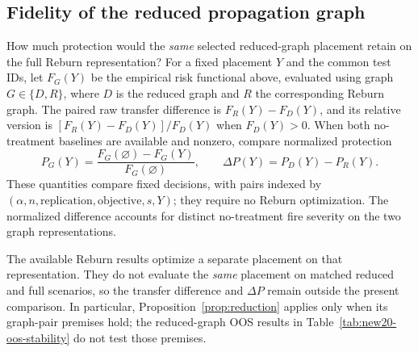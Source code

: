 \FloatBarrier
\subsection{Fidelity of the reduced propagation graph}\label{sec:graph-fidelity}

How much protection would the \emph{same} selected reduced-graph
placement retain on the full Reburn representation? For a fixed
placement $Y$ and the common test IDs, let $F_G(Y)$ be the empirical
risk functional above, evaluated using graph $G\in\{D,R\}$, where
$D$ is the reduced graph and $R$ the corresponding Reburn graph.
The paired raw transfer difference is $F_R(Y)-F_D(Y)$, and its relative
version is $[F_R(Y)-F_D(Y)]/F_D(Y)$ when $F_D(Y)>0$. When both
no-treatment baselines are available and nonzero, compare normalized
protection
\[
 P_G(Y)=\frac{F_G(\varnothing)-F_G(Y)}{F_G(\varnothing)},
 \qquad \Delta P(Y)=P_D(Y)-P_R(Y).
\]
These quantities compare fixed decisions, with pairs indexed by
$(\alpha,n,\text{replication},\text{objective},s,Y)$; they require no
Reburn optimization. The normalized difference accounts for distinct
no-treatment fire severity on the two graph representations.

The available Reburn results optimize a separate placement on that
representation. They do not evaluate the \emph{same} placement on
matched reduced and full scenarios, so the transfer difference and
$\Delta P$ remain outside the present comparison. In particular,
Proposition~\ref{prop:reduction} applies only when its graph-pair
premises hold; the reduced-graph OOS results in
Table~\ref{tab:new20-oos-stability} do not test those premises.

